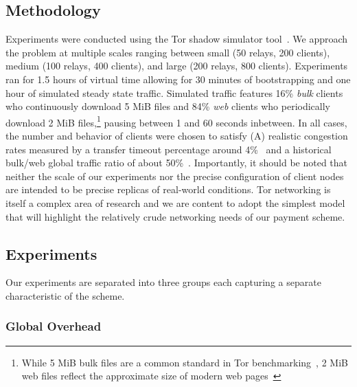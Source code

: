 \subsection{Methodology}
\label{subsec:methodology}

Experiments were conducted using the Tor shadow simulator
tool~\cite{jansen2011shadow}.
We approach the problem at multiple scales ranging between small (50 relays, 200
clients), medium (100 relays, 400 clients), and large (200 relays, 800
clients). Experiments ran for 1.5 hours of virtual time allowing for 30 minutes
of bootstrapping and one hour of simulated steady state traffic. Simulated
traffic features 16\% \emph{bulk} clients who continuously download 5 MiB files
and 84\% \emph{web} clients who periodically download 2 MiB
files,\footnote{While 5 MiB bulk files are a common standard in Tor
  benchmarking~\cite{portal2018tormetrics}, 2 MiB web files reflect the
  approximate size of modern web pages~\cite{team2018httparchive}} pausing
between 1 and 60 seconds inbetween. In all cases, the number and behavior of
clients were chosen to satisfy (A) realistic congestion rates measured by a
transfer timeout percentage around 4\%~\cite{portal2018tormetrics} and a historical
bulk/web global traffic ratio of about 50\%~\cite{chaabane2010digging,
  mccoy2008shining}. Importantly, it should be noted that neither the scale of
our experiments nor the precise configuration of client nodes are intended to be
precise replicas of real-world conditions. Tor networking is itself a complex
area of research and we are content to adopt the simplest model that will
highlight the relatively crude networking needs of our payment scheme.

\subsection{Experiments}
\label{subsec:experiments}
Our experiments are separated into three groups each capturing a separate
characteristic of the scheme.

\subsubsection{Global Overhead}

